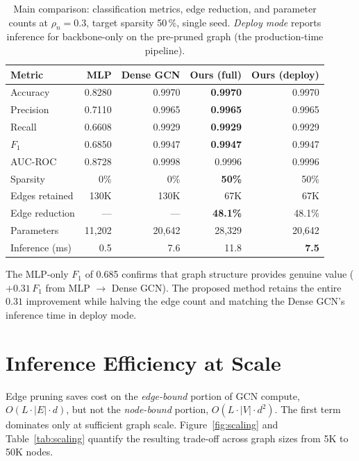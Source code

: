 \documentclass[11pt,a4paper]{report}
\theoremstyle{definition}
\theoremstyle{remark}
\begin{document}
\begin{table}[h]
\centering
\caption{Main comparison: classification metrics, edge reduction, and
parameter counts at $\rho_n=0.3$, target sparsity 50\,\%, single seed.
\emph{Deploy mode} reports inference for backbone-only on the pre-pruned
graph (the production-time pipeline).}
\label{tab:main}
\small
\begin{tabular}{lrrrr}
\toprule
\textbf{Metric} & \textbf{MLP} & \textbf{Dense GCN}
& \textbf{Ours (full)} & \textbf{Ours (deploy)} \\
\midrule
Accuracy            & 0.8280 & 0.9970 & \textbf{0.9970} & 0.9970 \\
Precision           & 0.7110 & 0.9965 & \textbf{0.9965} & 0.9965 \\
Recall              & 0.6608 & 0.9929 & \textbf{0.9929} & 0.9929 \\
$F_1$               & 0.6850 & 0.9947 & \textbf{0.9947} & 0.9947 \\
AUC-ROC             & 0.8728 & 0.9998 & 0.9996          & 0.9996 \\
\midrule
Sparsity            & 0\%    & 0\%    & \textbf{50\%}   & 50\% \\
Edges retained      & 130K   & 130K   & 67K             & 67K \\
Edge reduction      & ---    & ---    & \textbf{48.1\%} & 48.1\% \\
Parameters          & 11{,}202 & 20{,}642 & 28{,}329     & 20{,}642 \\
Inference (ms)      & 0.5    & 7.6    & 11.8            & \textbf{7.5} \\
\bottomrule
\end{tabular}
\end{table}

The MLP-only $F_1$ of 0.685 confirms that graph structure provides
genuine value ($+0.31\,F_1$ from MLP $\to$ Dense GCN). The proposed
method retains the entire $0.31$ improvement while halving the edge
count and matching the Dense GCN's inference time in deploy mode.

\section{Inference Efficiency at Scale}
\label{sec:inference}

Edge pruning saves cost on the \emph{edge-bound} portion of GCN
compute, $O(L\cdot|E|\cdot d)$, but not the \emph{node-bound} portion,
$O(L\cdot|V|\cdot d^2)$. The first term dominates only at sufficient
graph scale. Figure~\ref{fig:scaling} and Table~\ref{tab:scaling}
quantify the resulting trade-off across graph sizes from 5K to 50K
nodes.
\end{document}
